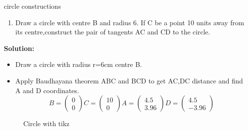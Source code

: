 \begin{frame}{circle constructions}
\begin{enumerate}
\conti 
\item Draw a circle with centre B and radius 6. If C be a point 10 units away from its centre,construct the pair of tangents AC and CD to
the circle.
\seti
\end{enumerate}
\textbf{Solution:}  
\begin{itemize}
\item Draw a circle with radius r=6cm centre B.
\item Apply Baudhayana theorem ABC and BCD to get AC,DC distance and find A and D coordinates.$$B=\begin{pmatrix}
0 \\ 0
\end{pmatrix}
C=\begin{pmatrix}
10 \\ 0
\end{pmatrix} 
A=\begin{pmatrix}4.5\\3.96\end{pmatrix} D=\begin{pmatrix}4.5\\-3.96\end{pmatrix}$$

\end{itemize}
\end{frame}
\begin{frame}
\begin{figure}[!ht]
\resizebox{0.8\linewidth}{!}
{



}
\caption{Circle with tikz}
\label{fig:foo}
\end{figure}
\end{frame}
